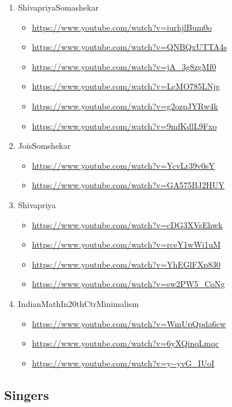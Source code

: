 \begin{enumerate}
\item ShivapriyaSomashekar
\label{sec:orga7769cf}
\begin{itemize}
\item \url{https://www.youtube.com/watch?v=iurhjlBum0o}
\item \url{https://www.youtube.com/watch?v=QNBQxUTTA4s}
\item \url{https://www.youtube.com/watch?v=jA\_3g8zgMf0}
\item \url{https://www.youtube.com/watch?v=LcMO785LNjg}
\item \url{https://www.youtube.com/watch?v=g2ozpJYRw4k}
\item \url{https://www.youtube.com/watch?v=9mfKdlL9Fxo}
\end{itemize}

\item JoisSomshekar
\label{sec:orgbdbc336}
\begin{itemize}
\item \url{https://www.youtube.com/watch?v=YcvLr39v0sY}
\item \url{https://www.youtube.com/watch?v=GA575BJ2HUY}
\end{itemize}

\item Shivapriya
\label{sec:orgafd7053}
\begin{itemize}
\item \url{https://www.youtube.com/watch?v=cDG3XVsEhwk}
\item \url{https://www.youtube.com/watch?v=rceY1wWi1uM}
\item \url{https://www.youtube.com/watch?v=YhEGlFXp830}
\item \url{https://www.youtube.com/watch?v=sw2PW5\_CoNg}
\end{itemize}

\item IndianMathIn20thCtrMinimalism
\label{sec:orgfca3ed0}
\begin{itemize}
\item \url{https://www.youtube.com/watch?v=WmUpQpda6cw}
\item \url{https://www.youtube.com/watch?v=6yXQinqLmqc}
\item \url{https://www.youtube.com/watch?v=y--yvG\_IUoI}
\end{itemize}
\end{enumerate}

\subsection{Singers}
\label{sec:org92697a5}


